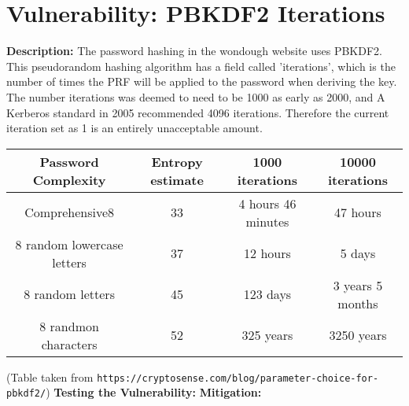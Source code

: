 \section{Vulnerability: PBKDF2 Iterations}
\label{sec:background}
\textbf{Description:} The password hashing in the wondough website uses PBKDF2. This pseudorandom hashing algorithm has a field called 'iterations', which is the number of times
the PRF will be applied to the password when deriving the key. The number iterations was deemed to need to be 1000 as early as 2000, and A Kerberos standard in 2005 recommended
4096 iterations. Therefore the current iteration set as 1 is an entirely unacceptable amount. \begin{center}
    \begin{tabular}{ |c|c|c|c| } 
     \hline
     Password Complexity & Entropy estimate & 1000 iterations &  10000 iterations\\ 
     \hline
     Comprehensive8 & 33 & 4 hours 46 minutes & 47 hours \\ 
     8 random lowercase letters & 37 & 12 hours & 5 days \\ 
     8 random letters & 45 & 123 days & 3 years 5 months \\
     8 randmon characters & 52 & 325 years & 3250 years \\
     \hline
    \end{tabular}
    \end{center} 
(Table taken from \verb|https://cryptosense.com/blog/parameter-choice-for-pbkdf2/|)
\textbf{Testing the Vulnerability:} 
\textbf{Mitigation:} 